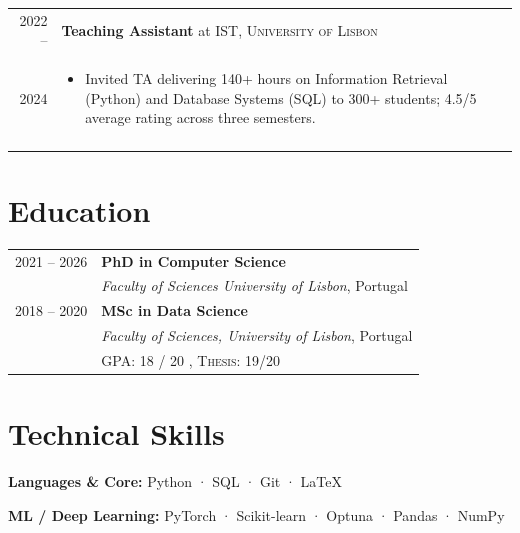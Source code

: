 \documentclass[a4paper,10pt]{article}
\begin{document}
\begin{tabularx}{\linewidth}{r|X}
\textsc{2022 --} & \textbf{Teaching Assistant} at \textsc{IST, University of Lisbon} \\
\textsc{2024} & 
\begin{itemize}[leftmargin=*, itemsep=1pt, topsep=0pt, partopsep=0pt]
  \item Invited TA delivering 140+ hours on Information Retrieval (Python) and Database Systems (SQL) to 300+ students; 4.5/5 average rating across three semesters.
\end{itemize} \\
& \\[-6pt]

\end{tabularx}



\vspace{-0.1cm}
\section{Education}
\begin{tabular}{rl}
\textsc{2021 -- 2026} & \textbf{PhD in Computer Science} \\
& \textit{Faculty of Sciences University of Lisbon}, Portugal \\[1ex]

\textsc{2018 -- 2020} & \textbf{MSc in Data Science} \\
& \textit{Faculty of Sciences, University of Lisbon}, Portugal \\
& \normalsize \textsc{GPA}: 18 / 20 , \textsc{Thesis}: 19/20\\[1ex]





\end{tabular}


\section{Technical Skills}

\textbf{Languages \& Core:} Python · SQL · Git · LaTeX

\textbf{ML / Deep Learning:} PyTorch · Scikit-learn · Optuna · Pandas · NumPy
\end{document}
